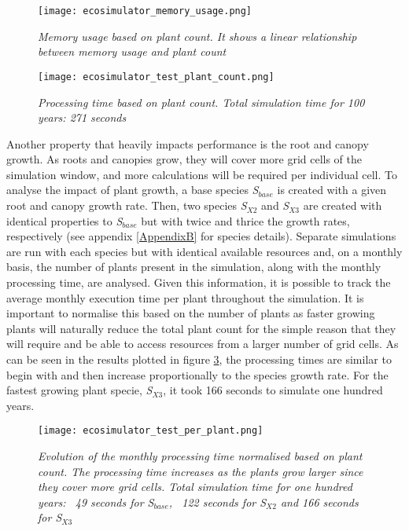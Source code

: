 \begin{figure}
\center
	\texttt{[image: ecosimulator\_memory\_usage.png]}
	\caption{ \textit{Memory usage based on plant count. It shows a linear relationship between memory usage and plant count}}	
	\label{fig:ecosimulator_test_memory_usage}
\end{figure}

\begin{figure}
\center
	\texttt{[image: ecosimulator\_test\_plant\_count.png]}
	\caption{ \textit{Processing time based on plant count. Total simulation time for 100 years: 271 seconds}}	
	\label{fig:ecosimulator_test_plant_count}
\end{figure}

Another property that heavily impacts performance is the root and canopy growth. As roots and canopies grow, they will cover more grid cells of the simulation window, and more calculations will be required per individual cell. To analyse the impact of plant growth, a base species \textit{S$_{base}$} is created with a given root and canopy growth rate. Then, two species \textit{S$_{X2}$} and \textit{S$_{X3}$} are created with identical properties to \textit{S$_{base}$} but with twice and thrice the growth rates, respectively (see appendix \ref{AppendixB} for species details). Separate simulations are run with each species but with identical available resources and, on a monthly basis, the number of plants present in the simulation, along with the monthly processing time, are analysed. Given this information, it is possible to track the average monthly execution time per plant throughout the simulation. It is important to normalise this based on the number of plants as faster growing plants will naturally reduce the total plant count for the simple reason that they will require and be able to access resources from a larger number of grid cells. As can be seen in the results plotted in figure \ref{fig:ecosimulator_test_per_plant}, the processing times are similar to begin with and then increase proportionally to the species growth rate. For the fastest growing plant specie, \textit{S$_{X3}$}, it took 166 seconds to simulate one hundred years.

\begin{figure}
\center
	\texttt{[image: ecosimulator\_test\_per\_plant.png]}
	\caption{ \textit{Evolution of the monthly processing time normalised based on plant count. The processing time increases as the plants grow larger since they cover more grid cells. Total simulation time for one hundred years: ~49 seconds for \textit{S$_{base}$}, ~122 seconds for \textit{S$_{X2}$} and 166 seconds for \textit{S$_{X3}$}}}
	\label{fig:ecosimulator_test_per_plant}
\end{figure}

